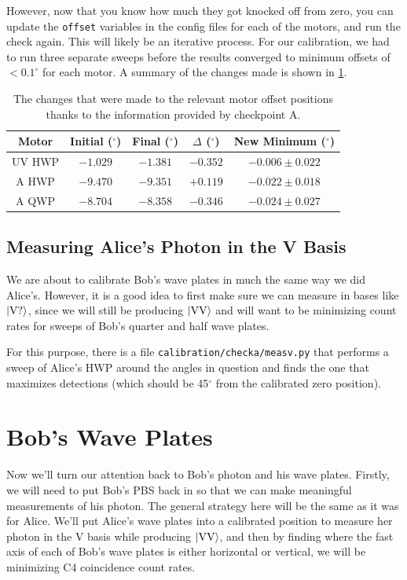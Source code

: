 \documentclass{paper}[11pt]
\begin{document}
	However, now that you know how much they got knocked off from zero, you can update the \texttt{offset} variables in the config files for each of the motors, and run the check again. This will likely be an iterative process. For our calibration, we had to run three separate sweeps before the results converged to minimum offsets of $<0.1^\circ$ for each motor. A summary of the changes made is shown in \cref{tab:checkpoint a}.
	\begin{table}[h]
		\centering
		\begin{tabular}{c||c|c|c|c}
		Motor & Initial ($^\circ$) & Final ($^\circ$) & $\Delta$ ($^\circ$) & New Minimum ($^\circ$) \\\hline
		UV HWP & $-1.029$ & $-1.381$ & $-0.352$ & $-0.006\pm0.022$ \\
		A HWP & $-9.470$ & $-9.351$ & $+0.119$ & $-0.022 \pm 0.018$\\
		A QWP & $-8.704$ & $-8.358$ & $-0.346$ & $-0.024\pm0.027$ \\
		\end{tabular}
		\caption{The changes that were made to the relevant motor offset positions thanks to the information provided by checkpoint A.}
		\label{tab:checkpoint a}
	\end{table}
	
	\subsection{Measuring Alice's Photon in the V Basis}
	
	We are about to calibrate Bob's wave plates in much the same way we did Alice's. However, it is a good idea to first make sure we can measure in bases like $\ket{\text{V?}}$, since we will still be producing $\ket{\text{VV}}$ and will want to be minimizing count rates for sweeps of Bob's quarter and half wave plates.
	
	For this purpose, there is a file \texttt{calibration/checka/measv.py} that performs a sweep of Alice's HWP around the angles in question and finds the one that maximizes detections (which should be 45$^\circ$ from the calibrated zero position).
	
	\section{Bob's Wave Plates}
	
	Now we'll turn our attention back to Bob's photon and his wave plates. Firstly, we will need to put Bob's PBS back in so that we can make meaningful measurements of his photon. The general strategy here will be the same as it was for Alice. We'll put Alice's wave plates into a calibrated position to measure her photon in the V basis while producing $\ket{\text{VV}}$, and then by finding where the fast axis of each of Bob's wave plates is either horizontal or vertical, we will be minimizing C4 coincidence count rates.
	
\end{document}
